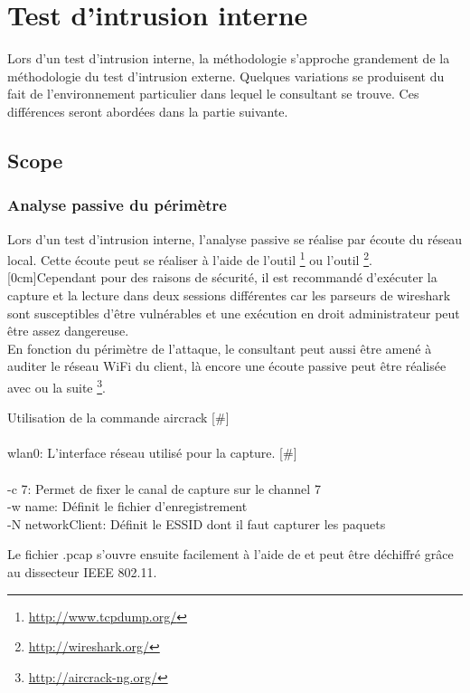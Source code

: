 \documentclass[twoside,a4paper,12pt,titlepage]{book}
\newcommand{\MarginPar}[2]{\marginnote{\scriptsize #1}[#2]}
\begin{document}
\section{Test d'intrusion interne}
	Lors d'un test d'intrusion interne, la méthodologie s'approche grandement de la méthodologie du test d'intrusion externe. Quelques variations se produisent du fait de l'environnement particulier dans lequel le consultant se trouve. Ces différences seront abordées dans la partie suivante.
\subsection{Scope}
\subsubsection{Analyse passive du périmètre}
Lors d'un test d'intrusion interne, l'analyse passive se réalise par écoute du réseau local. Cette écoute peut se réaliser à l'aide de l'outil \footnote{\url{http://www.tcpdump.org/}} ou l'outil \footnote{\url{http://wireshark.org/}}. \MarginPar{\textbf{Capture réseau}}{0cm}Cependant pour des raisons de sécurité, il est recommandé d'exécuter la capture et la lecture dans deux sessions différentes car les parseurs de wireshark sont susceptibles d'être vulnérables et une exécution en droit administrateur peut être assez dangereuse.\\
	En fonction du périmètre de l'attaque, le consultant peut aussi être amené à auditer le réseau WiFi du client, là encore une écoute passive peut être réalisée avec  ou la suite \footnote{\url{http://aircrack-ng.org/}}.
\begin{FlagConsole}{Utilisation de la commande aircrack}
	[\#]\\
	 \\
	wlan0: L'interface réseau utilisé pour la capture.
	\tcblower
	[\#]\\
	 \\
	-c 7: Permet de fixer le canal de capture sur le channel 7\\
	-w name: Définit le fichier d'enregistrement\\
	-N networkClient: Définit le ESSID dont il faut capturer les paquets\\
\end{FlagConsole}
	Le fichier .pcap s'ouvre ensuite facilement à l'aide de  et peut être déchiffré grâce au dissecteur IEEE 802.11.
\end{document}
